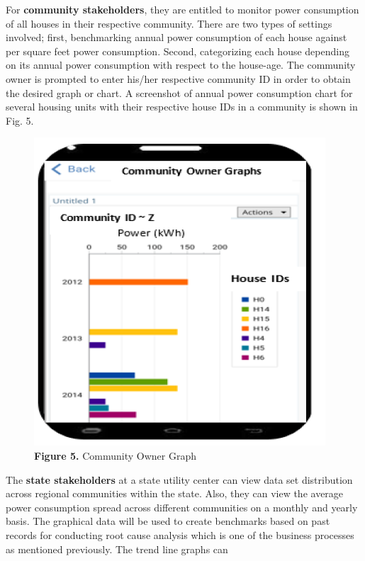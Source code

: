 \documentclass[a4paper,12pt,oneside]{article}
\let\counterwithin\relax
\begin{document}
\begin{itemize}
\begin{figure}[H]
        \end{figure}
    \newpage
    For \textbf{community stakeholders}, they are entitled to
    monitor power consumption of all houses in their respective
    community. There are two types of settings involved; first,
    benchmarking annual power consumption of each house
    against per square feet power consumption. Second,
    categorizing each house depending on its annual power
    consumption with respect to the house-age. The community
    owner is prompted to enter his/her respective community ID in
    order to obtain the desired graph or chart. A screenshot of
    annual power consumption chart for several housing units
    with their respective house IDs in a community is shown in
    Fig. 5.
    \newline
        \begin{figure}[H]
        \includegraphics{Figure5.png}
        \centering
        \caption{\textbf{Figure 5.} Community Owner Graph}
        \end{figure}
    \newpage
    The \textbf{state stakeholders} at a state utility center can view data set distribution across
    regional communities within the state. Also, they can view the
    average power consumption spread across different
    communities on a monthly and yearly basis. The graphical
    data will be used to create benchmarks based on past records
    for conducting root cause analysis which is one of the business
    processes as mentioned previously. The trend line graphs can

\end{itemize}
\end{document}
